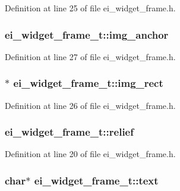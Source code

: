Definition at line 25 of file ei\-\_\-widget\-\_\-frame.\-h.

\hypertarget{structei__widget__frame__t_ab3fa3932c7b01d8495e1f974d02deacc}{
\subsubsection[{img\-\_\-anchor}]{ ei\-\_\-widget\-\_\-frame\-\_\-t\-::img\-\_\-anchor}}\label{structei__widget__frame__t_ab3fa3932c7b01d8495e1f974d02deacc}


Definition at line 27 of file ei\-\_\-widget\-\_\-frame.\-h.

\hypertarget{structei__widget__frame__t_a84c1c35a4c8ed8c0d7f07900d8683fdf}{
\subsubsection[{img\-\_\-rect}]{$\ast$ ei\-\_\-widget\-\_\-frame\-\_\-t\-::img\-\_\-rect}}\label{structei__widget__frame__t_a84c1c35a4c8ed8c0d7f07900d8683fdf}


Definition at line 26 of file ei\-\_\-widget\-\_\-frame.\-h.

\hypertarget{structei__widget__frame__t_ac5136274703286fdba8a9de420efc9e4}{
\subsubsection[{relief}]{ ei\-\_\-widget\-\_\-frame\-\_\-t\-::relief}}\label{structei__widget__frame__t_ac5136274703286fdba8a9de420efc9e4}


Definition at line 20 of file ei\-\_\-widget\-\_\-frame.\-h.

\hypertarget{structei__widget__frame__t_a44b96f7744db6a85b1d44195f636c37c}{
\subsubsection[{text}]{\setlength{\rightskip}{0pt plus 5cm}char$\ast$ ei\-\_\-widget\-\_\-frame\-\_\-t\-::text}}\label{structei__widget__frame__t_a44b96f7744db6a85b1d44195f636c37c}


